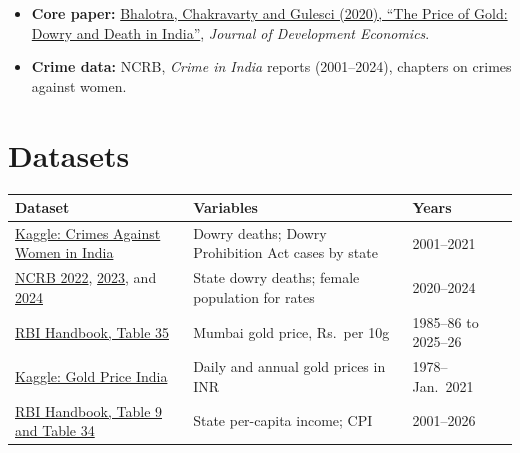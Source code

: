 \documentclass[12pt,a4paper]{article}
\begin{document}
\begin{itemize}
    \item \textbf{Core paper:}
    \href{https://docs.iza.org/dp9679.pdf}
    {Bhalotra, Chakravarty and Gulesci (2020),
    ``The Price of Gold: Dowry and Death in India''},
    \textit{Journal of Development Economics}.


    \item \textbf{Crime data:} NCRB, \textit{Crime in India}
    reports (2001--2024), chapters on crimes against women.
\end{itemize}

\section{Datasets}

\small
\begin{tabularx}{\textwidth}{
    >{\raggedright\arraybackslash}p{}
    >{\raggedright\arraybackslash}p{}
    X}
\toprule
\textbf{Dataset} & \textbf{Variables} & \textbf{Years}  \\
\midrule

\href{https://www.kaggle.com/datasets/balajivaraprasad/crimes-against-women-in-india-2001-2021}
{Kaggle: Crimes Against Women in India}
& Dowry deaths; Dowry Prohibition Act cases by state
& 2001--2021
 \\

\href{https://www.ncrb.gov.in/uploads/nationalcrimerecordsbureau/custom/1701607577CrimeinIndia2022Book1.pdf}
{NCRB 2022},
\href{https://data.opencity.in/dataset/crime-in-india-2023}
{2023}, and
\href{https://data.opencity.in/dataset/crime-in-india-2024}
{2024}
& State dowry deaths; female population for rates
& 2020--2024
 \\

\href{https://www.rbi.org.in/Scripts/PublicationsView.aspx?id=23860}
{RBI Handbook, Table 35}
& Mumbai gold price, Rs.\ per 10g
& 1985--86 to 2025--26
 \\

\href{https://www.kaggle.com/datasets/nguynvnphong/priceindia}
{Kaggle: Gold Price India}
& Daily and annual gold prices in INR
& 1978--Jan.\ 2021
 \\

\href{https://www.rbi.org.in/Scripts/PublicationsView.aspx?id=23834}
{RBI Handbook, Table 9 and Table 34}
& State per-capita income; CPI
& 2001--2026
 \\

\bottomrule
\end{tabularx}
\normalsize
\end{document}
